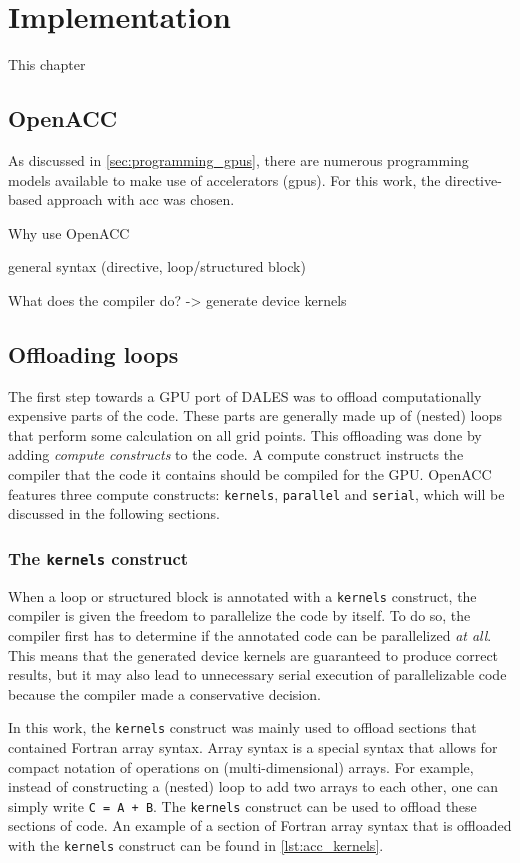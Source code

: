\chapter{Implementation}
This chapter 

\section{OpenACC}
As discussed in \autoref{sec:programming_gpus}, there are numerous programming models available to make use of accelerators (\acrshort{gpu}s). For this work, the directive-based approach with \acrshort{acc} was chosen. 

Why use OpenACC

general syntax (directive, loop/structured block)

What does the compiler do? -> generate device kernels

\section{Offloading loops}
The first step towards a GPU port of DALES was to offload computationally expensive parts of the code. These parts are generally made up of (nested) loops that perform some calculation on all grid points. This offloading was done by adding \emph{compute constructs} to the code. A compute construct instructs the compiler that the code it contains should be compiled for the GPU. OpenACC features three compute constructs: \texttt{kernels}, \texttt{parallel} and \texttt{serial}, which will be discussed in the following sections. 

\subsection{The \texttt{kernels} construct}
When a loop or structured block is annotated with a \texttt{kernels} construct, the compiler is given the freedom to parallelize the code by itself. To do so, the compiler first has to determine if the annotated code can be parallelized \emph{at all}. This means that the generated device kernels are guaranteed to produce correct results, but it may also lead to unnecessary serial execution of parallelizable code because the compiler made a conservative decision.

In this work, the \texttt{kernels} construct was mainly used to offload sections that contained Fortran array syntax. Array syntax is a special syntax that allows for compact notation of operations on (multi-dimensional) arrays. For example, instead of constructing a (nested) loop to add two arrays to each other, one can simply write \texttt{C = A + B}. The \texttt{kernels} construct can be used to offload these sections of code. An example of a section of Fortran array syntax that is offloaded with the \texttt{kernels} construct can be found in \autoref{lst:acc_kernels}.

